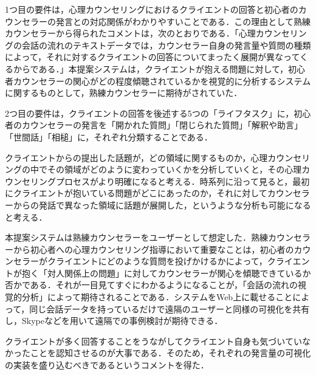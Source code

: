 \documentclass[shuuron]{kuee}
\begin{document}
1つ目の要件は，心理カウンセリングにおけるクライエントの回答と初心者のカウンセラーの発言との対応関係がわかりやすいことである．この理由として熟練カウンセラーから得られたコメントは，次のとおりである．「心理カウンセリングの会話の流れのテキストデータでは，カウンセラー自身の発言量や質問の種類によって，それに対するクライエントの回答についてまったく展開が異なってくるからである．」本提案システムは，クライエントが抱える問題に対して，初心者カウンセラーの関心がどの程度傾聴されているかを視覚的に分析するシステムに関するものとして，熟練カウンセラーに期待がされていた．

2つ目の要件は，クライエントの回答を後述する5つの「ライフタスク」に，初心者のカウンセラーの発言を「開かれた質問」「閉じられた質問」「解釈や助言」「世間話」「相槌」に，それぞれ分類することである．%

クライエントからの提出した話題が，どの領域に関するものか，心理カウンセリングの中でその領域がどのように変わっていくかを分析していくと，その心理カウンセリングプロセスがより明確になると考える．時系列に沿って見ると，最初にクライエントが抱いている問題がどこにあったのか，それに対してカウンセラーからの発話で異なった領域に話題が展開した，というような分析も可能になると考える．

本提案システムは熟練カウンセラーをユーザーとして想定した．熟練カウンセラーから初心者への心理カウンセリング指導において重要なことは，初心者のカウンセラーがクライエントにどのような質問を投げかけるかによって，クライエントが抱く「対人関係上の問題」に対してカウンセラーが関心を傾聴できているか否かである．それが一目見てすぐにわかるようになることが，「会話の流れの視覚的分析」によって期待されることである．システムをWeb上に載せることによって，同じ会話データを持っているだけで遠隔のユーザーと同様の可視化を共有し，Skypeなどを用いて遠隔での事例検討が期待できる．


クライエントが多く回答することをうながしてクライエント自身も気づいていなかったことを認知させるのが大事である．そのため，それぞれの発言量の可視化の実装を盛り込むべきであるというコメントを得た．

%
\end{document}
